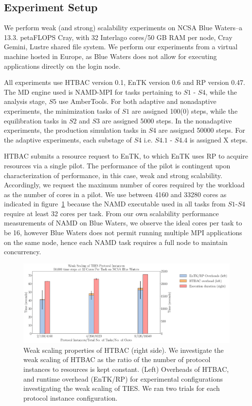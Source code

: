 \subsection{Experiment Setup}\label{ssec:exp_design}

We perform weak (and strong) scalability experiments on NCSA Blue Waters--a 13.3. petaFLOPS Cray, with 32 Interlago cores/50 GB RAM per node, Cray Gemini, Lustre shared file system. We perform our
experiments from a virtual machine hosted in Europe, as Blue
Waters does not allow for executing applications directly on
the login node.

All experiments use HTBAC version 0.1, EnTK version 0.6 and RP
version 0.47. The MD engine used is NAMD-MPI for tasks pertaining to $S1$ - $S4$, while the analysis stage, $S5$ use AmberTools. For both adaptive and nonadaptive experiments, the minimization
tasks of $S1$ are assigned 100(0) steps, while the equilibration
tasks in $S2$ and $S3$ are assigned 5000 steps. In the nonadaptive experiments, the production
simulation tasks in $S4$ are assigned 50000 steps. For the
adaptive experiments, each substage of $S4$ i.e. $S4.1$ - $S4.4$ is assigned X steps.

HTBAC submits a resource request to EnTK, to which EnTK uses
RP to acquire resources via a single pilot. The performance of
the pilot is contingent upon characterization of
performance, in this case, weak and strong scalability. Accordingly, we request the maximum number of cores required
by the workload as the number of cores in a pilot. We use between
4160 and 33280 cores as indicated in figure~\ref{fig:weak_scaling}
because the NAMD executable used in all tasks from $S1$-$S4$ require at
least 32 cores per task. From our own scalability performance measurements of
NAMD on Blue Waters, we observe the ideal cores per task to be 16,
however Blue Waters does not permit running multiple MPI applications on the same node,
hence each NAMD task requires a full node to maintain concurrency.

\begin{figure}
  \centering
   \includegraphics[width=\columnwidth]{./figures/weak_scaling_TIES_instances_50,000_timesteps.pdf}
  \caption{Weak scaling properties of HTBAC (right side). We investigate the
  weak scaling of HTBAC as the ratio of the number of protocol instances to
  resources is kept constant. (Left) Overheads of HTBAC, and runtime overhead (EnTK/RP) for
  experimental configurations investigating the weak scaling of TIES. We ran two trials for each protocol instance configuration.}
\label{fig:weak_scaling}
\end{figure}


